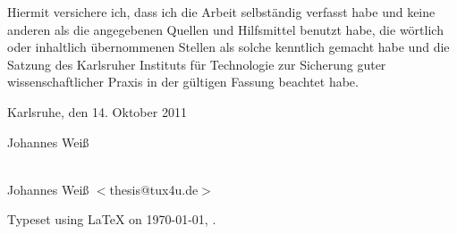 \maketitle

\vspace*{\fill}


\bigskip{}

\noindent{}Hiermit versichere ich, dass ich die Arbeit selbst\"andig verfasst
habe und keine anderen als die angegebenen Quellen und Hilfsmittel benutzt habe,
die w\"ortlich oder inhaltlich \"ubernommenen Stellen als solche kenntlich
gemacht habe und die Satzung des Karlsruher Instituts f\"ur Technologie zur
Sicherung guter wissenschaftlicher Praxis in der g\"ultigen Fassung beachtet
habe.

\bigskip{}

Karlsruhe, den 14. Oktober 2011

\bigskip{}

\bigskip{}
Johannes Wei\ss

\vspace*{\fill}

\cleardoublepage

\vspace*{\fill}
\begin{center}
{\Large \JWtitle{}} \\
Johannes Wei\ss{} $<$thesis@tux4u.de$>$
\end{center}
\vspace*{\fill}

\newpage

\null
\vfill
\hfill Typeset using \LaTeX{} on \today{}, \currenttime{}.

